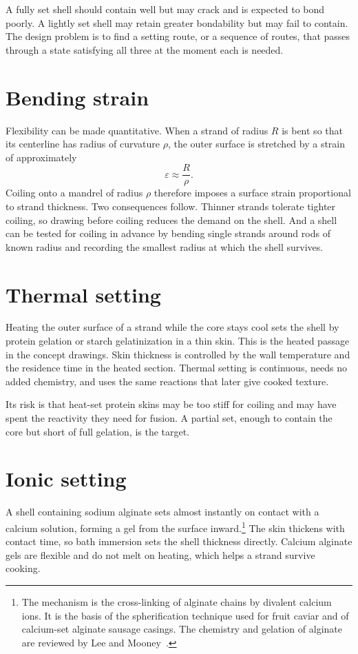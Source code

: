 \documentclass[11pt,openany]{book}
\theoremstyle{definition}
\begin{document}
A fully set shell should contain well but may crack and is expected to bond poorly. A lightly set shell may retain greater bondability but may fail to contain. The design problem is to find a setting route, or a sequence of routes, that passes through a state satisfying all three at the moment each is needed.

\section{Bending strain}

Flexibility can be made quantitative. When a strand of radius $R$ is bent so that its centerline has radius of curvature $\rho$, the outer surface is stretched by a strain of approximately
\[
\varepsilon \approx \frac{R}{\rho}.
\]
Coiling onto a mandrel of radius $\rho$ therefore imposes a surface strain proportional to strand thickness. Two consequences follow. Thinner strands tolerate tighter coiling, so drawing before coiling reduces the demand on the shell. And a shell can be tested for coiling in advance by bending single strands around rods of known radius and recording the smallest radius at which the shell survives.

\section{Thermal setting}

Heating the outer surface of a strand while the core stays cool sets the shell by protein gelation or starch gelatinization in a thin skin. This is the heated passage in the concept drawings. Skin thickness is controlled by the wall temperature and the residence time in the heated section. Thermal setting is continuous, needs no added chemistry, and uses the same reactions that later give cooked texture.

Its risk is that heat-set protein skins may be too stiff for coiling and may have spent the reactivity they need for fusion. A partial set, enough to contain the core but short of full gelation, is the target.

\section{Ionic setting}

A shell containing sodium alginate sets almost instantly on contact with a calcium solution, forming a gel from the surface inward.\footnote{The mechanism is the cross-linking of alginate chains by divalent calcium ions. It is the basis of the spherification technique used for fruit caviar and of calcium-set alginate sausage casings. The chemistry and gelation of alginate are reviewed by Lee and Mooney~\cite{lee2012}.} The skin thickens with contact time, so bath immersion sets the shell thickness directly. Calcium alginate gels are flexible and do not melt on heating, which helps a strand survive cooking.
\end{document}
